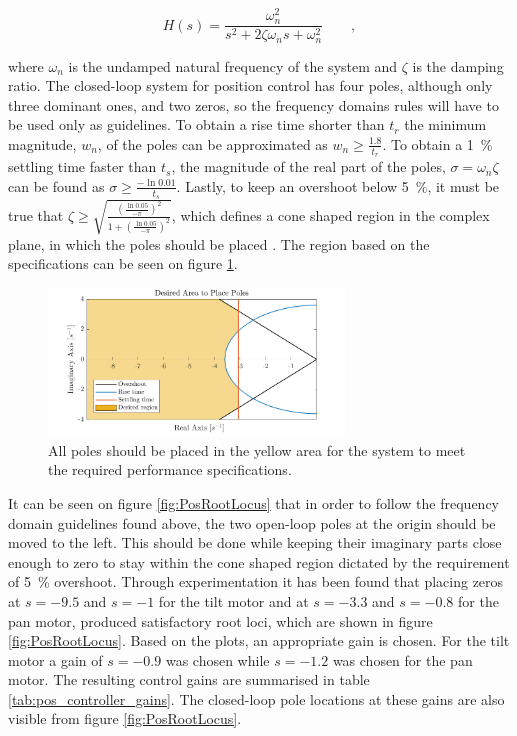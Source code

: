 \documentclass[../../main.tex]{subfiles}
\begin{document}
\begin{equation} \label{eq:basic_second_order_tf}
    H(s) = \frac{\omega_n^2}{s^2 + 2\zeta \omega_n s + \omega_n^2} \qquad ,
\end{equation}

where $\omega_{n}$ is the undamped natural frequency of the system and $\zeta$ is the damping ratio. 
The closed-loop system for position control has four poles, although only three dominant ones, and two zeros, so the frequency domains rules will have to be used only as guidelines. To obtain a rise time shorter than $t_r$ the minimum magnitude, $w_n$, of the poles can be approximated as $w_n\geq\frac{1.8}{t_r}$. To obtain a \SI{1}{\percent} settling time faster than $t_s$, the magnitude of the real part of the poles, $\sigma = \omega_n \zeta$ can be found as $\sigma \geq \frac{-\ln{0.01}}{t_s} $. Lastly, to keep an overshoot below \SI{5}{\percent}, it must be true that $\zeta \geq \sqrt{\frac{(\frac{\ln{0.05}}{-\pi})^2}{1+(\frac{\ln{0.05}}{-\pi})^2}}$, which defines a cone shaped region in the complex plane, in which the poles should be placed \cite{TimeDomainSpecifications}. The region based on the specifications can be seen on figure \ref{fig:system_requirements}.


\begin{figure}
    \centering
    \includegraphics[width=0.7\textwidth]{Sections/System_Design/Images/system_requirements_new.png}
    \caption{All poles should be placed in the yellow area for the system to meet the required performance specifications.}
    \label{fig:system_requirements}
\end{figure}

It can be seen on figure \ref{fig:PosRootLocus} that in order to follow the frequency domain guidelines found above, the two open-loop poles at the origin should be moved to the left. This should be done while keeping their imaginary parts close enough to zero to stay within the cone shaped region dictated by the requirement of \SI{5}{\percent} overshoot.
Through experimentation it has been found that placing zeros at $s=-9.5$ and $s=-1$ for the tilt motor and at $s=-3.3$ and $s=-0.8$ for the pan motor, produced satisfactory root loci, which are shown in figure \ref{fig:PosRootLocus}. Based on the plots, an appropriate gain is chosen. For the tilt motor a gain of $s=-0.9$ was chosen while $s=-1.2$ was chosen for the pan motor. The resulting control gains are summarised in table \ref{tab:pos_controller_gains}. The closed-loop pole locations at these gains are also visible from figure \ref{fig:PosRootLocus}.
\end{document}
